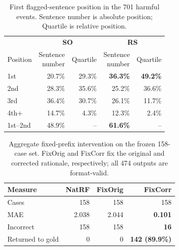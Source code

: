\begin{table}[!tp]
\centering
\captionsetup{font=normalsize,skip=2pt}
\small
\setlength{\tabcolsep}{8pt}
\renewcommand{\arraystretch}{1.05}

\begin{tabular}{@{}lrrrr@{}}
\toprule
& \multicolumn{2}{c}{\textbf{SO}}
& \multicolumn{2}{c}{\textbf{RS}} \\
\cmidrule(lr){2-3}\cmidrule(lr){4-5}
Position
& \shortstack{Sentence\\number}
& Quartile
& \shortstack{Sentence\\number}
& Quartile \\
\midrule
1st
& 20.7\% & 29.3\%
& \textbf{36.3\%} & \textbf{49.2\%} \\

2nd
& 28.3\% & 35.6\%
& 25.2\% & 36.6\% \\

3rd
& 36.4\% & 30.7\%
& 26.1\% & 11.7\% \\

4th+
& 14.7\% & 4.3\%
& 12.3\% & 2.4\% \\

1st--2nd
& 48.9\% & --
& \textbf{61.6\%} & -- \\
\bottomrule
\end{tabular}

\caption{First flagged-sentence position in the 701 harmful events.
Sentence number is absolute position; Quartile is relative position.}
\label{tab:full-first-error-position}
\end{table}

\begin{table}[!tp]
\centering
\captionsetup{font=normalsize,skip=2pt}
\small
\setlength{\tabcolsep}{8pt}
\renewcommand{\arraystretch}{1.05}

\begin{tabular}{@{}lrrr@{}}
\toprule
Measure & NatRF & FixOrig & FixCorr \\
\midrule
Cases & 158 & 158 & 158 \\
MAE & 2.038 & 2.044 & \textbf{0.101} \\
Incorrect & 158 & 158 & \textbf{16} \\
Returned to gold & 0 & 0 & \textbf{142 (89.9\%)} \\
\bottomrule
\end{tabular}

\caption{Aggregate fixed-prefix intervention on the frozen 158-case
set. FixOrig and FixCorr fix the original and corrected rationale,
respectively; all 474 outputs are format-valid.}
\label{tab:full-correction-aggregate}
\end{table}

